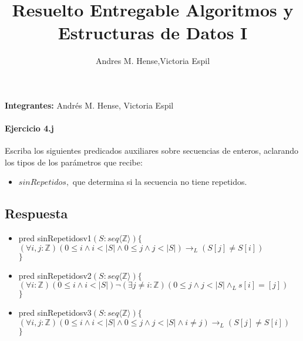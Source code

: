 \documentclass[a4paper]{article}
\title{Resuelto Entregable Algoritmos y Estructuras de Datos I}
\author{Andres M. Hense,Victoria Espil}
\date{} %
\begin{document}




\begin{center}
\textbf{Integrantes:} Andrés M. Hense, Victoria Espil
\end{center}

\paragraph{Ejercicio 4.j} Escriba los siguientes predicados auxiliares sobre secuencias de enteros, aclarando los tipos de los parámetros que recibe:

\begin{itemize}
	\item $sinRepetidos,$ que determina si la secuencia no tiene repetidos.
\end{itemize}

\subsection*{Respuesta}

\begin{itemize}
	\item pred sinRepetidosv1$(S: seq\langle \mathbb{Z} \rangle)\{$\\
\hspace*{6mm}$(\forall i,j:\mathbb{Z})(0\leq i\wedge i<\vert S\vert \wedge 0\leq j\wedge j<\vert S\vert)\rightarrow_L (S[j] \neq S[i])$\\
$\}$
	\item pred sinRepetidosv2$(S: seq\langle \mathbb{Z} \rangle)\{$\\
\hspace*{6mm}$(\forall i:\mathbb{Z})(0\leq i\wedge i<\vert S\vert)\neg(\exists j\neq i:\mathbb{Z})
 (0\leq j\wedge j<\vert S\vert \wedge_L s[i]=[j])$\\
$\}$
	\item pred sinRepetidosv3$(S: seq\langle \mathbb{Z} \rangle)\{$\\
\hspace*{6mm}$(\forall i,j:\mathbb{Z})(0\leq i\wedge i<\vert S\vert \wedge 0\leq j\wedge
 j<\vert S\vert\wedge i\neq j)\rightarrow_L (S[j] \neq S[i])$\\
$\}$
\end{itemize}
\end{document}
